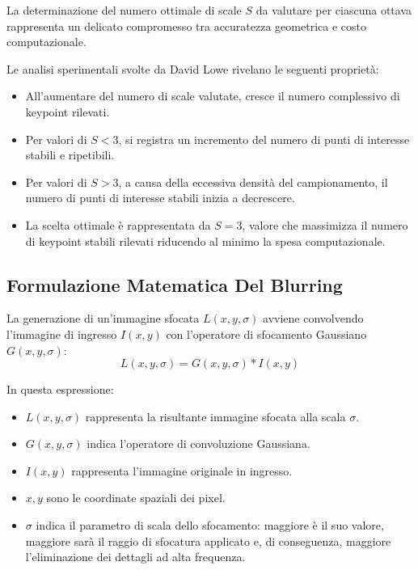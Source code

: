 ﻿\documentclass[11pt, a4paper]{article}
\begin{document}
La determinazione del numero ottimale di scale $S$ da valutare per ciascuna ottava rappresenta un delicato compromesso tra accuratezza geometrica e costo computazionale.


Le analisi sperimentali svolte da David Lowe rivelano le seguenti proprietà:
\begin{itemize}
    \item All'aumentare del numero di scale valutate, cresce il numero complessivo di keypoint rilevati.
    \item Per valori di $S < 3$, si registra un incremento del numero di punti di interesse stabili e ripetibili.
    \item Per valori di $S > 3$, a causa della eccessiva densità del campionamento, il numero di punti di interesse stabili inizia a decrescere.
    \item La scelta ottimale è rappresentata da $S = 3$, valore che massimizza il numero di keypoint stabili rilevati riducendo al minimo la spesa computazionale.
\end{itemize}

\subsection{Formulazione Matematica Del Blurring}

La generazione di un'immagine sfocata $L(x, y, \sigma)$ avviene convolvendo l'immagine di ingresso $I(x, y)$ con l'operatore di sfocamento Gaussiano $G(x, y, \sigma)$:
\[ L(x, y, \sigma) = G(x, y, \sigma) * I(x, y) \]

In questa espressione:
\begin{itemize}
    \item $L(x, y, \sigma)$ rappresenta la risultante immagine sfocata alla scala $\sigma$.
    \item $G(x, y, \sigma)$ indica l'operatore di convoluzione Gaussiana.
    \item $I(x, y)$ rappresenta l'immagine originale in ingresso.
    \item $x, y$ sono le coordinate spaziali dei pixel.
    \item $\sigma$ indica il parametro di scala dello sfocamento: maggiore è il suo valore, maggiore sarà il raggio di sfocatura applicato e, di conseguenza, maggiore l'eliminazione dei dettagli ad alta frequenza.
\end{itemize}
\end{document}

